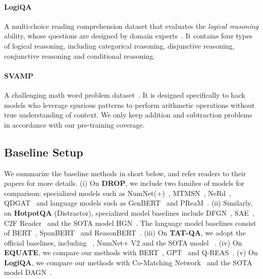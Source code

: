 \paragraph{LogiQA} A multi-choice reading comprehension dataset that evaluates the \textit{logical reasoning} ability, whose questions are designed by domain experts~\cite{ijcai2020-501}.
It contains four types of logical reasoning, including categorical reasoning, disjunctive reasoning, conjunctive reasoning and conditional reasoning.


\paragraph{SVAMP} A challenging math word problem dataset~\cite{patel-etal-2021-nlp}. 
It is designed specifically to hack models who leverage spurious patterns to perform arithmetic operations without true understanding of context.
We only keep addition and subtraction problems in accordance with our pre-training coverage.

\subsection{Baseline Setup}

We summarize the baseline methods in short below, and refer readers to their papers for more details.
(i) On \textbf{DROP}, we include two families of models for comparison: specialized models such as NumNet(+)~\citep{ran-etal-2019-numnet}, MTMSN~\citep{hu-etal-2019-multi}, NeRd~\citep{Chen2020Neural}, QDGAT~\cite{chen-etal-2020-question} and language models such as GenBERT~\citep{geva-etal-2020-injecting} and  PReaM~\citep{DBLP:journals/corr/abs-2107-07261}.
(ii) Similarly, on \textbf{HotpotQA} (Distractor), specialized model baselines include DFGN~\citep{qiu-etal-2019-dynamically}, SAE~\citep{DBLP:conf/aaai/TuHW0HZ20}, C2F Reader~\citep{shao-etal-2020-graph} and the SOTA model HGN~\citep{fang-etal-2020-hierarchical}. The language model baselines consist of BERT~\citep{devlin-etal-2019-bert}, SpanBERT~\citep{joshi-etal-2020-spanbert} and ReasonBERT~\citep{deng2021reasonbert}.
(iii) On \textbf{TAT-QA}, we adopt the official baselines, including \tapas~\citep{herzig-etal-2020-tapas}, NumNet+ V2 and the SOTA model \tagop~\citep{zhu-etal-2021-tat}.
(iv) On \textbf{EQUATE}, we compare our methods with BERT~\citep{devlin-etal-2019-bert}, GPT~\citep{radford2019language} and Q-REAS~\citep{ravichander-etal-2019-equate}.
(v) On \textbf{LogiQA}, we compare our methods with Co-Matching Network~\citep{wang-etal-2018-co} and the SOTA model DAGN~\citep{huang-etal-2021-dagn}.


